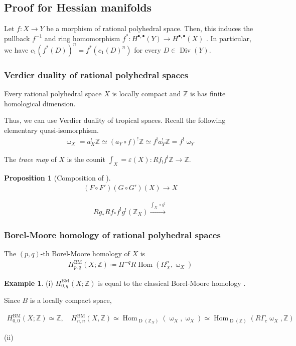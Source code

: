 \documentclass[a4paper,dvipdfmx,reqno,12pt]{amsart}
\makeatletter
\newcommand{\ind}[2]{\emph{#1}\index{1{#2}@{#1}}}
\theoremstyle{definition}
\newtheorem{Eg}[Thm]{Example}
\newtheorem{Prop}[Thm]{Proposition}
\newcommand{\deq}{\coloneqq}
\newcommand{\Z}{\mathbb{Z}}%
\newcommand{\vep}{\varepsilon}%
\newcommand{\opn}[1]{\operatorname{#1}}
\newcommand{\xto}[1]{\xrightarrow{#1}}
\numberwithin{equation}{section}
\makeatother
\begin{document}
\subsection{Proof for Hessian manifolds}


Let $f:X\to Y$ be a morphism of rational polyhedral space.
Then, this induces the pullback $f^{-1} $ and ring homomorphism
$f^{*}:H^{\bullet,\bullet}(Y)\to H^{\bullet,\bullet}(X)$ \cite[Proposition 4.17]{gross2019sheaftheoretic}. In particular, we have
$c_1(f^{*}(D))^{n}=f^{*}(c_1(D)^{n})$ for every $D\in\opn{Div}(Y)$.
\subsubsection{Verdier duality of rational polyhedral spaces}

Every rational polyhedral space $X$ is locally compact and $\Z$ is has finite homological dimension.

Thus, we can use Verdier duality of tropical spaces.
Recall the following elementary quasi-isomorphism.
\begin{align}
  \upomega_X=a_X^{!}\Z\simeq (a_Y\circ f)^{!}\Z \simeq f^{!}a_Y^{!}\Z=f^{!}\upomega_Y
\end{align}

The \ind{trace map}{trace map} of $X$ is the counit
$\int_X=\vep(X):Rf_!f^{!}\Z\to \Z$.

\begin{Prop}[Composition of ]
  \begin{align}
    (F\circ F')(G\circ G')(X)\to X
  \end{align}

  \begin{align}
    Rg_*Rf_*f^{!}g^{!}(\Z_X)\xto{\int_X\circ g^{!}}
  \end{align}

\end{Prop}

\subsubsection{Borel-Moore homology of rational polyhedral spaces}
The $(p,q)$-th Borel-Moore homology of $X$ is
\begin{align}
  H^{\opn{BM}}_{p,q}(X;\Z)\deq H^{-q}R\opn{Hom}(\Omega_X^{p},\upomega_X)
\end{align}

\begin{Eg} (i) $H_{0,q}^{\opn{BM}}(X;\Z)$ is equal to the classical Borel-Moore homology
  \cite[Lemma 4.8]{gross2019sheaftheoretic}.

  Since $B$ is a locally compact space,

  \begin{align}
    H_{0,0}^{\opn{BM}}(X;\Z)\simeq \Z,\quad H^{\opn{BM}}_{n,n}(X,\Z)\simeq \opn{Hom}_{\opn{D}(\Z_X)}(\upomega_X,\upomega_X)\simeq
    \opn{Hom}_{\opn{D}(\Z)}(R\Gamma_c\upomega_X,\Z)
  \end{align}

  (ii)

\end{Eg}
\end{document}
